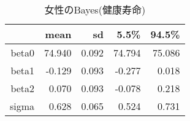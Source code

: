 \begin{table}[ht]
\centering
\begingroup\tiny
\begin{tabular}{rrrrr}
  \hline
 & mean & sd & 5.5\% & 94.5\% \\ 
  \hline
beta0 & 74.940 & 0.092 & 74.794 & 75.086 \\ 
  beta1 & -0.129 & 0.093 & -0.277 & 0.018 \\ 
  beta2 & 0.070 & 0.093 & -0.078 & 0.218 \\ 
  sigma & 0.628 & 0.065 & 0.524 & 0.731 \\ 
   \hline
\end{tabular}
\endgroup
\caption{女性のBayes(健康寿命)} 
\label{table_Gamma_HLE_FA_m}
\end{table}
